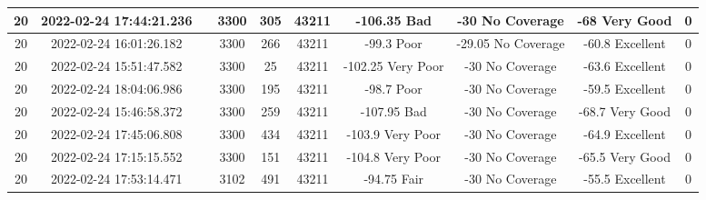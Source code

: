 \begin{longtable*}{|c|c|c|c|c|c|c|c|c|c|}
20&2022-02-24 17:44:21.236&&3300&305&43211& -106.35   Bad         & -30       No Coverage & -68       Very Good   & 0\\\hline
{}20&2022-02-24 16:01:26.182&&3300&266&43211& -99.3     Poor        & -29.05    No Coverage & -60.8     Excellent   & 0\\\hline
{}20&2022-02-24 15:51:47.582&&3300&25&43211& -102.25   Very Poor   & -30       No Coverage & -63.6     Excellent   & 0\\\hline
{}20&2022-02-24 18:04:06.986&&3300&195&43211& -98.7     Poor        & -30       No Coverage & -59.5     Excellent   & 0\\\hline
{}20&2022-02-24 15:46:58.372&&3300&259&43211& -107.95   Bad         & -30       No Coverage & -68.7     Very Good   & 0\\\hline
{}20&2022-02-24 17:45:06.808&&3300&434&43211& -103.9    Very Poor   & -30       No Coverage & -64.9     Excellent   & 0\\\hline
{}20&2022-02-24 17:15:15.552&&3300&151&43211& -104.8    Very Poor   & -30       No Coverage & -65.5     Very Good   & 0\\\hline
{}20&2022-02-24 17:53:14.471&&3102&491&43211& -94.75    Fair        & -30       No Coverage & -55.5     Excellent   & 0\\\hline

\end{longtable*}
